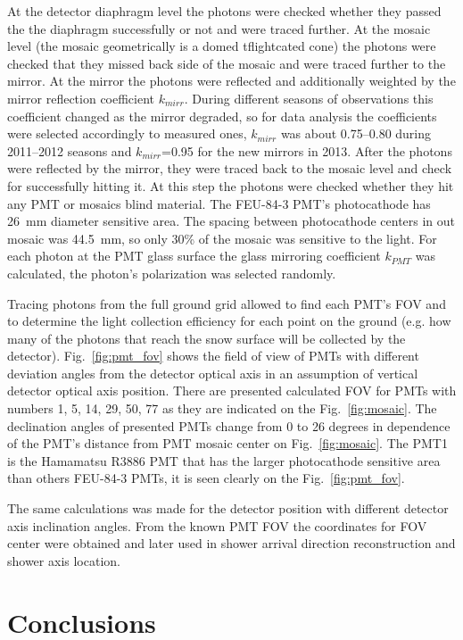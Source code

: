\documentclass[final,5p,times,twocolumn]{elsarticle}
\begin{document}
At the detector diaphragm level the photons were checked whether they passed the the diaphragm successfully or not and were traced further. At the mosaic level (the mosaic geometrically is a domed {\color{red}tflightcated} cone) the photons were checked that they missed back side of the mosaic and were traced further to the mirror. At the mirror the photons were reflected and additionally weighted by the mirror reflection coefficient $k_{mirr}$. During different seasons of observations this coefficient changed as the mirror degraded, so for data analysis the coefficients were selected accordingly to {\color{red} measured ones}, $k_{mirr}$ was about 0.75--0.80 during 2011--2012 seasons and $k_{mirr}$=0.95 for the new mirrors in 2013. After the photons were reflected by the mirror, they were traced back to the mosaic level and check for successfully hitting it. At this step the photons were checked whether they hit any PMT or mosaics blind material. The \mbox{FEU-84-3} PMT's photocathode has 26~mm diameter sensitive area. The spacing between photocathode centers in out mosaic was 44.5~mm, so only 30\% of the mosaic was sensitive to the light. For each photon at the PMT glass surface the glass mirroring coefficient $k_{PMT}$ was calculated, the photon's polarization was selected randomly.

Tracing photons from the full ground grid allowed to find each PMT's FOV and to determine the light collection efficiency for each point on the ground (e.g. how many of the photons that reach the snow surface will be collected by the detector).
Fig.~\ref{fig:pmt_fov} shows the field of view of PMTs with different deviation angles  from the detector optical axis in an assumption of vertical detector optical axis position. There are presented calculated FOV for PMTs with numbers 1, 5, 14, 29, 50, 77 as they are indicated on the Fig.~\ref{fig:mosaic}. The declination angles of presented PMTs change from 0 to 26 degrees in dependence of the PMT's distance from PMT mosaic center on Fig.~\ref{fig:mosaic}. The PMT1 is the Hamamatsu R3886 PMT that has the larger photocathode sensitive area than others FEU-84-3 PMTs, it is seen clearly on the Fig.~\ref{fig:pmt_fov}. 

The same calculations was made for the detector position with different detector axis inclination angles. From the known PMT FOV the coordinates for FOV center were obtained and later used in shower arrival direction reconstruction and shower axis location.


\section{Conclusions \label{sect:conclusions}}
\end{document}
